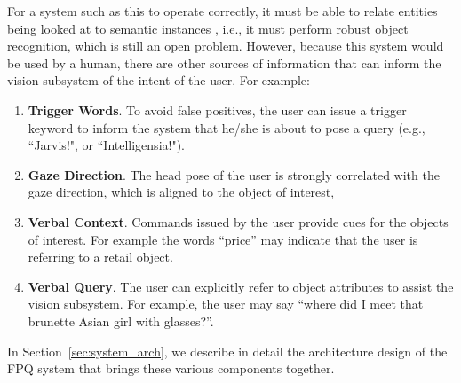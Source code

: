 \documentclass{llncs}
\begin{document}
For a system such as this to operate correctly, it must be able to
relate entities being looked at to semantic instances , i.e., it must
perform robust object recognition, which is still an open
problem. However, because this system would be used by a human, there
are other sources of information that can inform the vision subsystem
of the intent of the user. For example:
\begin{enumerate}
\item
\textbf{Trigger Words}. To avoid false positives, the user can issue a trigger keyword to inform the system that he/she is about to pose a query (e.g., ``Jarvis!", or ``Intelligensia!"). 
\item
\textbf{Gaze Direction}. The head pose of the user is strongly correlated with the gaze direction, which is aligned to the object of interest, 
\item
\textbf{Verbal Context}. Commands issued by the user provide cues for the objects of interest. For example the words ``price''  may indicate that the user is referring to a retail object. 
\item
\textbf{Verbal Query}. The user can explicitly refer to object attributes to assist the vision subsystem. For example, the user may say ``where did I meet that brunette Asian girl with glasses?''.
\end{enumerate}
In Section~\ref{sec:system_arch}, we describe in detail the
architecture design of the FPQ system that brings these various
components together.
\end{document}
